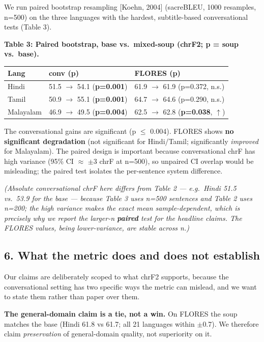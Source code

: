 \documentclass[
  11pt,
]{article}
\begin{document}
We run paired bootstrap resampling {[}Koehn, 2004{]} (sacreBLEU, 1000
resamples, n=500) on the three languages with the hardest,
subtitle-based conversational tests (Table 3).

\textbf{Table 3: Paired bootstrap, base vs.~mixed-soup (chrF2; p = soup
vs.~base).}

\begin{longtable}[]{@{}lll@{}}
\toprule\noalign{}
Lang & conv (p) & FLORES (p) \\
\midrule\noalign{}
\endhead
\bottomrule\noalign{}
\endlastfoot
Hindi & 51.5 $\to$ 54.1 (\textbf{p=0.001}) & 61.9 $\to$ 61.9 (p=0.372, n.s.) \\
Tamil & 50.9 $\to$ 55.1 (\textbf{p=0.001}) & 64.7 $\to$ 64.6 (p=0.290, n.s.) \\
Malayalam & 46.9 $\to$ 49.5 (\textbf{p=0.004}) & 62.5 $\to$ 62.8
(\textbf{p=0.038}, $\uparrow$) \\
\end{longtable}

The conversational gains are significant (p $\le$ 0.004). FLORES shows
\textbf{no significant degradation} (not significant for Hindi/Tamil;
significantly \emph{improved} for Malayalam). The paired design is
important because conversational chrF has high variance (95\% CI $\approx$ $\pm$3
chrF at n=500), so unpaired CI overlap would be misleading; the paired
test isolates the per-sentence system difference.

\emph{(Absolute conversational chrF here differs from Table 2 ---
e.g.~Hindi 51.5 vs.~53.9 for the base --- because Table 3 uses n=500
sentences and Table 2 uses n=200; the high variance makes the exact mean
sample-dependent, which is precisely why we report the larger-n
\textbf{paired} test for the headline claims. The FLORES values, being
lower-variance, are stable across n.)}

\hypertarget{what-the-metric-does-and-does-not-establish}{%
\subsection{6. What the metric does and does not
establish}\label{what-the-metric-does-and-does-not-establish}}

Our claims are deliberately scoped to what chrF2 supports, because the
conversational setting has two specific ways the metric can mislead, and
we want to state them rather than paper over them.

\textbf{The general-domain claim is a tie, not a win.} On FLORES the
soup matches the base (Hindi 61.8 vs 61.7; all 21 languages within
$\pm$0.7). We therefore claim \emph{preservation} of general-domain quality,
not superiority on it.
\end{document}
